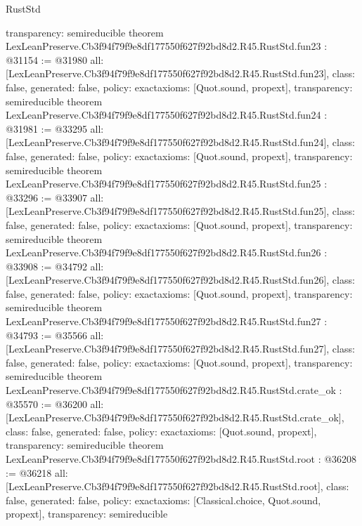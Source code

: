 \begin{lexlean}{RustStd}
\begin{coremodule}
{  transparency: semireducible
}
theorem LexLeanPreserve.Cb3f94f79f9e8df177550f627f92bd8d2.R45.RustStd.fun23 : @31154 := @31980 {
  all: [LexLeanPreserve.Cb3f94f79f9e8df177550f627f92bd8d2.R45.RustStd.fun23],
  class: false,
  generated: false,
  policy: exact{axioms: [Quot.sound, propext]},
  transparency: semireducible
}
theorem LexLeanPreserve.Cb3f94f79f9e8df177550f627f92bd8d2.R45.RustStd.fun24 : @31981 := @33295 {
  all: [LexLeanPreserve.Cb3f94f79f9e8df177550f627f92bd8d2.R45.RustStd.fun24],
  class: false,
  generated: false,
  policy: exact{axioms: [Quot.sound, propext]},
  transparency: semireducible
}
theorem LexLeanPreserve.Cb3f94f79f9e8df177550f627f92bd8d2.R45.RustStd.fun25 : @33296 := @33907 {
  all: [LexLeanPreserve.Cb3f94f79f9e8df177550f627f92bd8d2.R45.RustStd.fun25],
  class: false,
  generated: false,
  policy: exact{axioms: [Quot.sound, propext]},
  transparency: semireducible
}
theorem LexLeanPreserve.Cb3f94f79f9e8df177550f627f92bd8d2.R45.RustStd.fun26 : @33908 := @34792 {
  all: [LexLeanPreserve.Cb3f94f79f9e8df177550f627f92bd8d2.R45.RustStd.fun26],
  class: false,
  generated: false,
  policy: exact{axioms: [Quot.sound, propext]},
  transparency: semireducible
}
theorem LexLeanPreserve.Cb3f94f79f9e8df177550f627f92bd8d2.R45.RustStd.fun27 : @34793 := @35566 {
  all: [LexLeanPreserve.Cb3f94f79f9e8df177550f627f92bd8d2.R45.RustStd.fun27],
  class: false,
  generated: false,
  policy: exact{axioms: [Quot.sound, propext]},
  transparency: semireducible
}
theorem LexLeanPreserve.Cb3f94f79f9e8df177550f627f92bd8d2.R45.RustStd.crate_ok : @35570 := @36200 {
  all: [LexLeanPreserve.Cb3f94f79f9e8df177550f627f92bd8d2.R45.RustStd.crate_ok],
  class: false,
  generated: false,
  policy: exact{axioms: [Quot.sound, propext]},
  transparency: semireducible
}
theorem LexLeanPreserve.Cb3f94f79f9e8df177550f627f92bd8d2.R45.RustStd.root : @36208 := @36218 {
  all: [LexLeanPreserve.Cb3f94f79f9e8df177550f627f92bd8d2.R45.RustStd.root],
  class: false,
  generated: false,
  policy: exact{axioms: [Classical.choice, Quot.sound, propext]},
  transparency: semireducible
}


\end{coremodule}
\end{lexlean}
